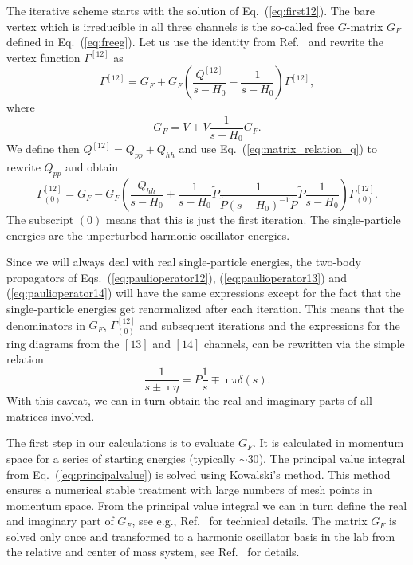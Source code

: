 The iterative scheme starts with the solution of Eq.\ (\ref{eq:first12}).
The bare vertex which is irreducible in all three channels
is the so-called free $G$-matrix $G_F$ defined in Eq.\ (\ref{eq:freeg}).
Let us use the identity from Ref.\ \cite{bbp63} and rewrite the
vertex function $\Gamma^{[12]}$ as
\begin{equation}
    \Gamma^{[12]}=G_F+G_F\left(\frac{Q^{[12]}}{s-H_0}
                               -\frac{1}{s-H_0}\right)\Gamma^{[12]},
\end{equation}
where 
\[
  G_F = V+V\frac{1}{s-H_0}G_F.
\]
We define then $Q^{[12]}=Q_{pp}+Q_{hh}$ and use
Eq.\ (\ref{eq:matrix_relation_q}) to rewrite $Q_{pp}$ and obtain
\begin{equation}
   \Gamma^{[12]}_{(0)}=G_F-G_F\left(\frac{Q_{hh}}{s-H_0}+
   \frac{1}{s-H_0}\tilde{P}\frac{1}{\tilde{P}(s-H_0)^{-1}
   \tilde{P}}\tilde{P}\frac{1}{s-H_0}\right)\Gamma^{[12]}_{(0)}.
   \label{eq:approx12channel}
\end{equation}
The subscript $(0)$ means that this is just the first iteration.
The single-particle energies are the unperturbed
harmonic oscillator energies.  

Since we will always deal with real single-particle energies,
the two-body propagators of Eqs.\ (\ref{eq:paulioperator12}),
(\ref{eq:paulioperator13}) and (\ref{eq:paulioperator14})
will have the same expressions except for the fact that
the single-particle energies get renormalized after each 
iteration. This means that 
the denominators 
in $G_F$, $\Gamma^{[12]}_{(0)}$ and subsequent iterations
and the expressions for the ring diagrams from the $[13]$ and 
$[14]$ channels, 
can be rewritten  via the simple relation
\begin{equation}
     \frac{1}{s\pm \imath\eta}=P\frac{1}{s}\mp\imath\pi\delta(s).
     \label{eq:principalvalue}
\end{equation}
With this caveat, we can in turn obtain the real and imaginary parts
of all matrices involved.

The first step in our calculations is to evaluate $G_F$.  It is 
calculated in momentum space for a series of starting
energies (typically $\sim 30$).
The principal value integral from Eq.\ (\ref{eq:principalvalue})
is solved  using Kowalski's
\cite{kowalski67} 
method. This method  ensures a numerical 
stable treatment with large numbers of
mesh points in momentum space. From the principal value integral we
can in turn define the real and imaginary part of $G_F$, see 
e.g., Ref.\ \cite{rpd89} for technical details.
The matrix $G_F$ is solved only once and transformed
to a harmonic oscillator basis in the lab from the 
relative and center of mass system, see Ref.\ \cite{hko95}
for details.


